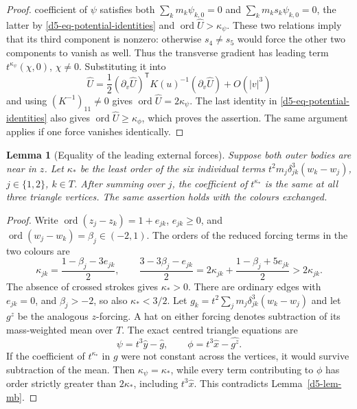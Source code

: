 \documentclass[11pt]{amsart}
\newtheorem{lemma}[theorem]{Lemma}
\theoremstyle{definition}
\theoremstyle{remark}
\newcommand{\ord}{\operatorname{ord}}
\begin{document}
{\begin{proof}
coefficient of $\psi$ satisfies both $\sum_km_k\psi_{k,0}=0$ and
$\sum_km_ks_k\psi_{k,0}=0$, the latter by
\eqref{d5-eq-potential-identities} and $\ord\widehat U>\kappa_\psi$.
These two relations imply that its third component is nonzero: otherwise
$s_4\ne s_5$ would force the other two components to vanish as well.
Thus the transverse gradient has leading term
$t^{\kappa_\psi}(\chi,0)$, $\chi\ne0$.  Substituting it into
\[
 \widehat U=\frac12(\partial_v\widehat U)^{\mathsf T}K(u)^{-1}
 (\partial_v\widehat U)+O(|v|^3)
\]
and using $(K^{-1})_{11}\ne0$ gives $\ord\widehat U=2\kappa_\psi$.
The last identity in \eqref{d5-eq-potential-identities} also gives
$\ord\widehat U\ge\kappa_\phi$, which proves the assertion.
The same argument applies if one force vanishes identically.
\end{proof}

\begin{lemma}[Equality of the leading external forces]\label{d5-lem-uniform}
Suppose both outer bodies are near in $z$.  Let $\kappa_*$ be the least order of
the six individual terms $t^2m_j\delta_{jk}^3(w_k-w_j)$, $j\in\{1,2\}$, $k\in T$.
After summing over $j$, the coefficient of $t^{\kappa_*}$ is the same at all
three triangle vertices.  The same assertion holds with the colours exchanged.
\end{lemma}
\begin{proof}
Write $\ord(z_j-z_k)=1+e_{jk}$, $e_{jk}\ge0$, and
$\ord(w_j-w_k)=\beta_j\in(-2,1)$.  The orders of the reduced forcing terms in
the two colours are
\[
 \kappa_{jk}=\frac{1-\beta_j-3e_{jk}}2,
 \qquad
 \frac{3-3\beta_j-e_{jk}}2
 =2\kappa_{jk}+\frac{1-\beta_j+5e_{jk}}2>2\kappa_{jk}.
\]
The absence of crossed strokes gives $\kappa_*>0$.  There are ordinary edges
with $e_{jk}=0$, and $\beta_j>-2$, so also $\kappa_*<3/2$.
Let $g_k=t^2\sum_jm_j\delta_{jk}^3(w_k-w_j)$ and let $g^z$ be the analogous
$z$-forcing.  A hat on either forcing denotes subtraction of its mass-weighted
mean over $T$.  The exact centred triangle equations are
\[
 \psi=t^3\hat y-\widehat g,\qquad
 \phi=t^3\hat x-\widehat {g^z}.
\]
If the coefficient of $t^{\kappa_*}$ in $g$ were not constant across the
vertices, it would survive subtraction of the mean.  Then
$\kappa_\psi=\kappa_*$, while every term contributing to $\phi$ has order
strictly greater than $2\kappa_*$, including $t^3\hat x$.
This contradicts Lemma~\ref{d5-lem-mb}.
\end{proof}

}
\end{document}
